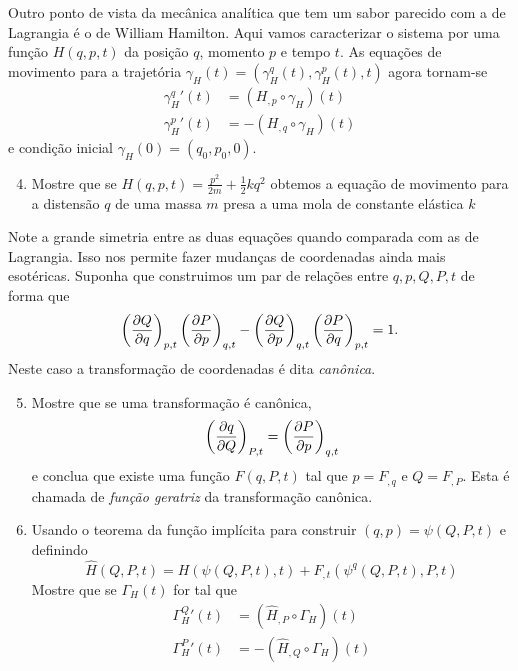 \begin{enumerate}
        Outro ponto de vista da mecânica analítica que tem um sabor parecido com
        a de Lagrangia é o de William Hamilton. Aqui vamos caracterizar o
        sistema por uma função $H(q,p,t)$ da posição $q$, momento $p$ e tempo
        $t$. As equações de movimento para a trajetória $\gamma_H(t)=
        (\gamma_H^q(t),\gamma_H^p(t),t)$ agora tornam-se
        \begin{align*}
            \gamma_H^q{'}(t)&=(H_{,p}\circ\gamma_H)(t)\\
            \gamma_H^p{'}(t)&=-(H_{,q}\circ\gamma_H)(t)
        \end{align*}
        e condição inicial $\gamma_H(0)=(q_0,p_0,0)$.
        \begin{enumerate}
            \setcounter{enumii}{3}
            \item
                Mostre que se $H(q,p,t)=\frac{p^2}{2m}+\frac{1}{2}kq^2$ obtemos
                a equação de movimento para a distensão $q$ de uma massa $m$
                presa a uma mola de constante elástica $k$
        \end{enumerate}
        Note a grande simetria entre as duas equações quando comparada com as de
        Lagrangia. Isso nos permite fazer mudanças de coordenadas ainda mais
        esotéricas. Suponha que construimos um par de relações entre $q,p,Q,P,t$
        de forma que
        $$\pd{Q}{q}{p,t}\pd{P}{p}{q,t}-\pd{Q}{p}{q,t}\pd{P}{q}{p,t}=1.$$
        Neste caso a transformação de coordenadas é dita \emph{canônica}.
        \begin{enumerate}
            \setcounter{enumii}{4}
            \item
                Mostre que se uma transformação é canônica,
                $$\pd{q}{Q}{P,t}=\pd{P}{p}{q,t}$$
                e conclua que existe uma função $F(q,P,t)$ tal que $p=F_{,q}$ e
                $Q=F_{,P}$. Esta é chamada de \emph{função geratriz} da
                transformação canônica.
            \item
                Usando o teorema da função implícita para construir $(q,p)=\psi
                (Q,P,t)$ e definindo
                $$\hat H(Q,P,t)=H(\psi(Q,P,t),t)+F_{,t}(\psi^q(Q,P,t),P,t)$$
                Mostre que se $\Gamma_H(t)$ for tal que
                \begin{align*}
                    \Gamma_H^Q{'}(t)&=(\hat H_{,P}\circ\Gamma_H)(t)\\
                    \Gamma_H^P{'}(t)&=-(\hat H_{,Q}\circ\Gamma_H)(t)
                \end{align*}

\end{enumerate}
\end{enumerate}
